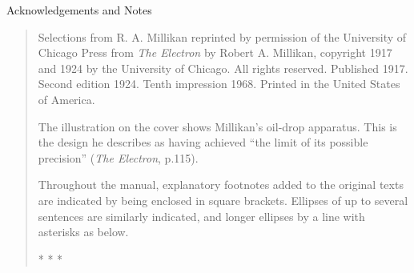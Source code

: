 \vspace*{3in}
Acknowledgements and Notes


\begin{quote}

Selections from R. A. Millikan reprinted by permission of the University of Chicago Press from \emph{The Electron } by Robert A. Millikan, copyright 1917 and 1924 by the University of Chicago.  All rights reserved.  Published 1917.  Second edition 1924.  Tenth impression 1968.  Printed in the United States of America.



The illustration on the cover shows Millikan’s oil-drop apparatus.  This is the design he describes as having achieved “the limit of its possible precision” (\emph{The Electron}, p.115).  

Throughout the manual, explanatory footnotes added to the original texts are indicated by being enclosed in square brackets. Ellipses of up to several sentences are similarly indicated, and longer ellipses by a line with asterisks as below.

\vspace*{11pt}

\centerline{* * *}


\end{quote}